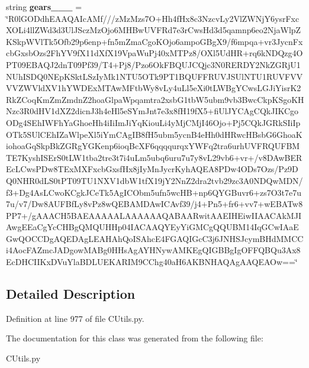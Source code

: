 \begin{DoxyCompactItemize}
\item 
\mbox{\label{class_c_utils_1_1_utils_1_1_resources_1_1_icons_acbc0d7a87c2283678725941ef5f9d14f}} 
string {\bfseries gears\+\_\+\_\+\_} = \char`\"{}R0l\+G\+O\+Ddh\+E\+A\+A\+Q\+A\+Ic\+A\+Mf///z\+Mz\+Mzs7O+Hh4f\+Hx8c3\+Nzcv\+Ly2\+Vl\+Z\+W\+Nj\+Y6ysr\+Fxc\+X\+O\+Li4ll\+Z\+Wd3d3\+Ul\+J\+Scz\+Mz\+Ojo6\+M\+H\+Bw\+U\+V\+F\+Rd7e3r\+Cws\+Hd3d5qamnp6eo2\+Nja\+Wlp\+Z\+K\+Skp\+W\+Vl\+Tk5\+Ofb29p6enp+fn5m\+Zma\+Cgo\+K\+Ojo6ampo\+G\+Bg\+X9/f6mpqa+vr3\+Jycn\+Fxcb\+Gxsb\+Ozs2\+Fh\+Y\+V9f\+X11d\+Xf\+X19\+Vpa\+Wu\+Pj40x\+M\+T\+Pz8/O\+Xl5\+Ud\+HR+rq6k\+N\+D\+Qzg4\+O\+P\+T09\+E\+B\+A\+Q\+J2dn\+T09\+Pf39/T4+Pj8/Pzo6\+Ok\+F\+B\+Q\+U\+J\+C\+Qjc3\+N0\+R\+E\+R\+D\+Y2\+Nk\+Z\+G\+Rj\+U1\+N\+Uh\+I\+S\+D\+Q0\+N\+Ep\+K\+Skt\+L\+Sz\+Iy\+Mk1\+N\+T\+U5\+O\+Tk9\+P\+T1\+B\+Q\+U\+F\+F\+R\+U\+V\+J\+S\+Ul\+N\+T\+U1\+R\+U\+V\+F\+V\+V\+V\+V\+Z\+W\+Vld\+X\+V1h\+Y\+W\+D\+Ex\+M\+T\+Aw\+M\+Ftb\+Wy8v\+Ly4u\+Ll5e\+Xi0t\+L\+W\+Bg\+Y\+Cws\+L\+G\+Ji\+Yisr\+K2\+Rk\+Z\+Coq\+Km\+Zm\+Zmdn\+Z2hoa\+Glpa\+Wpqamtra2xsb\+G1tb\+W5ubm9vb3\+Bwc\+Ckp\+K\+Sgo\+K\+H\+Nzc3\+R0d\+H\+V1d\+X\+Z2dicn\+J3h4e\+Hl5e\+S\+Ym\+Jnt7e3x8f\+H19f\+X5+fi\+Ul\+J\+Y\+C\+Ag\+C\+Qk\+J\+I\+K\+Cgo\+O\+Dg4\+S\+Eh\+I\+W\+Fh\+Ya\+Ghoe\+Hh4i\+Ii\+Im\+Ji\+Yq\+Kiou\+Li4y\+Mj\+C\+Mj\+I46\+Ojo+Pj5\+C\+Qk\+J\+G\+Rk\+S\+Ii\+Ip\+O\+Tk5\+S\+Ul\+C\+Eh\+I\+Za\+Wlpe\+Xl5i\+Ym\+C\+Ag\+I\+B8f\+H5ubm5ycn\+B4e\+Hh0d\+H\+Rwc\+H\+Bsb\+G6\+Ghoa\+Kiohoa\+Gq\+Skp\+Bk\+Z\+G\+Rg\+Y\+G\+Kenp6ioq\+Bc\+X\+F6qqqqurqx\+Y\+W\+Fq2tra6urh\+U\+V\+F\+R\+Q\+U\+F\+B\+M\+T\+E7\+Kysh\+I\+S\+Er\+S0t\+L\+W1tba2tre3t7i4u\+Lm5ubq6uru7u7y8v\+L29vb6+vr+/v8\+D\+Aw\+B\+E\+R\+Ec\+L\+Cws\+P\+Dw8\+T\+Ex\+M\+X\+Fxcb\+Gxsf\+Hx8j\+Iy\+Mn\+Jycr\+Kyh\+A\+Q\+E\+A8\+P\+Dw4\+O\+Ds7\+Ozs/Pz9\+D\+Q0\+N\+H\+R0d\+L\+S0t\+P\+T09\+T\+U1\+N\+X\+V1db\+W1tf\+X19j\+Y2\+Nn\+Z2dra2tvb29zc3\+A0\+N\+D\+Qw\+M\+DN/f3+Dg4\+As\+L\+Cwo\+K\+Cgk\+J\+Ce\+Tk5\+Ag\+I\+C\+Obm5ufn5wc\+HB+np6\+Q\+Y\+G\+Buvr6+zs7\+O3t7e7u7u/v7/Dw8\+A\+U\+F\+Bf\+Ly8v\+Pz8w\+Q\+E\+B\+A\+M\+D\+Aw\+I\+C\+Avf39/j4+Pn5+fr6+vv7+w\+E\+B\+A\+Tw8\+P\+P7+/g\+A\+A\+A\+C\+H5\+B\+A\+E\+A\+A\+A\+A\+A\+L\+A\+A\+A\+A\+A\+A\+Q\+A\+B\+A\+A\+Rwit\+A\+A\+E\+I\+H\+Eiw\+I\+I\+A\+A\+C\+Ak\+M\+J\+I\+Awg\+E\+Ea\+Cg\+Yc\+C\+H\+Bg\+Q\+M\+Q\+U\+H\+Hp04\+I\+A\+C\+A\+A\+Q\+Y\+Ey\+Yi\+G\+M\+Cg\+Q\+Q\+U\+B\+M14\+Iq\+G\+Cw\+I\+Aa\+E\+Gw\+Q\+O\+C\+C\+Dg\+A\+Q\+E\+D\+Ag\+L\+E\+A\+H\+Ah\+Qo\+I\+S\+Ahc\+E4\+F\+G\+A\+Q\+I\+Gc\+C3j6\+J\+N\+H\+S\+Jcym\+B\+Hd\+M\+M\+C\+Ci4\+Aoc\+F\+A\+Zmc\+J\+A\+Dgow\+M\+A\+Bg0\+H\+Hs\+Ag\+A\+Y\+H\+Nyw\+A\+M\+K\+Eg\+Q\+I\+G\+B\+Bg\+Ig\+O\+F\+F\+Q\+B\+Qu3\+Ax8\+Ec\+D\+H\+C\+I\+I\+Kx\+D\+Vu\+Yla\+B\+D\+L\+U\+E\+K\+A\+R\+I\+M9\+C\+Chg40a\+H6\+A\+K\+B\+N\+H\+A\+Q\+Ag\+A\+A\+Q\+E\+A\+Ow==\char`\"{}
\end{DoxyCompactItemize}


\subsection{Detailed Description}


Definition at line 977 of file C\+Utils.\+py.



The documentation for this class was generated from the following file\+:\begin{DoxyCompactItemize}
\item 
C\+Utils.\+py\end{DoxyCompactItemize}
